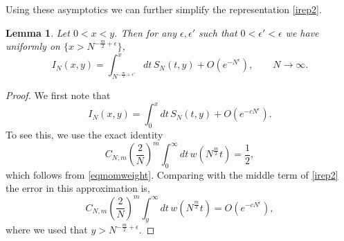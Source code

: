 \documentclass[11pt,reqno]{amsproc}
\newtheorem{lemma}[theorem]{Lemma}
\numberwithin{equation}{section}
\numberwithin{theorem}{section}
\begin{document}
Using these asymptotics we can further simplify the representation \eqref{irep2}.
\begin{lemma}
Let $0 < x < y$. Then for any $\epsilon, \epsilon'$ such that $0 < \epsilon' < \epsilon$ we have uniformly on $\{x > N^{-\frac{m}{2}+\epsilon}\}$, 
\begin{equation}
I_{N}(x,y) = \int_{N^{-\frac{m}{2}+\epsilon'}}^{x}dt\,S_{N}(t,y) + O(e^{-N^{\epsilon}}), \qquad N \to \infty. \label{irep3}
\end{equation}
\end{lemma}
\begin{proof}
We first note that
\begin{equation}
I_{N}(x,y) = \int_{0}^{x}dt\,S_{N}(t,y) + O(e^{-cN^{\epsilon}}).
\end{equation}
To see this, we use the exact identity
\begin{equation}
C_{N,m}\left(\frac{2}{N}\right)^{m}\int_{0}^{\infty}dt\,w(N^{\frac{m}{2}}t) = \frac{1}{2},
\end{equation}
which follows from \eqref{eqmomweight}. Comparing with the middle term of \eqref{irep2} the error in this approximation is,
\begin{equation}
C_{N,m}\left(\frac{2}{N}\right)^{m}\int_{y}^{\infty}dt\,w(N^{\frac{m}{2}}t) = O(e^{-cN^{\epsilon}}), \label{weightint}
\end{equation}
where we used that $y > N^{-\frac{m}{2}+\epsilon}$.


\end{proof}
\end{document}
